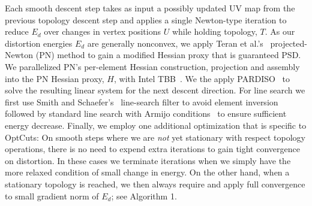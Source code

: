 Each smooth descent step takes as input a possibly updated UV map from the previous topology descent step and applies a single Newton-type iteration to reduce $E_d$ over changes in vertex positions $U$ while holding topology, $T$.
%
As our distortion energies $E_{d}$ are generally nonconvex, we apply Teran et al.'s\  projected-Newton (PN) method to gain a modified Hessian proxy that is guaranteed PSD. We parallelized PN's per-element Hessian construction,   projection and assembly into the PN Hessian proxy, $H$, with Intel TBB~\cite{Reinders2007Intel}.  We the apply PARDISO~\cite{pardiso-6.0a, pardiso-6.0b} to solve the resulting linear system for the next descent direction. For line search we first use Smith and Schaefer's~ line-search filter to avoid element inversion followed by standard line search with Armijo conditions~ to ensure sufficient energy decrease. Finally, we employ one additional optimization that is specific to OptCuts: On smooth steps where we are \emph{not} yet stationary with respect topology operations, there is no need to expend extra iterations to gain tight convergence on distortion. In these cases we terminate iterations when we simply have the more relaxed condition of small change in energy. On the other hand, when a stationary topology is reached, we then always require and apply full convergence to small gradient norm of $E_d$; see Algorithm 1.

